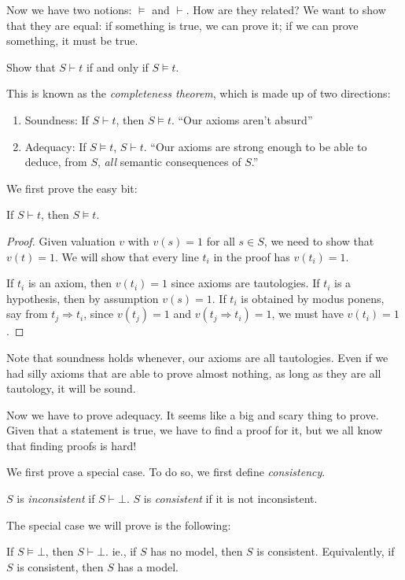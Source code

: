 \documentclass[a4paper]{article}
\begin{document}
Now we have two notions: $\models$ and $\vdash$. How are they related? We want to show that they are equal: if something is true, we can prove it; if we can prove something, it must be true.

\begin{aim}
 Show that $S\vdash t$ if and only if $S\models t$.
 \end{aim}
This is known as the \emph{completeness theorem}, which is made up of two directions:
\begin{enumerate}
  \item Soundness: If $S\vdash t$, then $S\models t$. ``Our axioms aren't absurd''
  \item Adequacy: If $S\models t$, $S\vdash t$.  ``Our axioms are strong enough to be able to deduce, from $S$, \emph{all} semantic consequences of $S$.''
\end{enumerate}

We first prove the easy bit:
\begin{prop}
  If $S\vdash t$, then $S\models t$.
\end{prop}

\begin{proof}
  Given valuation $v$ with $v(s) = 1$ for all $s\in S$, we need to show that $v(t) = 1$. We will show that every line $t_i$ in the proof has $v(t_i) = 1$.

  If $t_i$ is an axiom, then $v(t_i) = 1$ since axioms are tautologies. If $t_i$ is a hypothesis, then by assumption $v(s) = 1$. If $t_i$ is obtained by modus ponens, say from $t_j \Rightarrow t_i$, since $v(t_j) = 1$ and $v(t_j \Rightarrow t_i) = 1$, we must have $v(t_i) = 1$.
\end{proof}
Note that soundness holds whenever, our axioms are all tautologies. Even if we had silly axioms that are able to prove almost nothing, as long as they are all tautology, it will be sound.

Now we have to prove adequacy. It seems like a big and scary thing to prove. Given that a statement is true, we have to find a proof for it, but we all know that finding proofs is hard!

We first prove a special case. To do so, we first define \emph{consistency}.
\begin{defi}[Consistent]
  $S$ is \emph{inconsistent} if $S\vdash \bot$. $S$ is \emph{consistent} if it is not inconsistent.
\end{defi}

The special case we will prove is the following:
\begin{thm}
  If $S\models \bot$, then $S\vdash \bot$. ie., if $S$ has no model, then $S$ is consistent. Equivalently, if $S$ is consistent, then $S$ has a model.

\end{thm}
\end{document}

